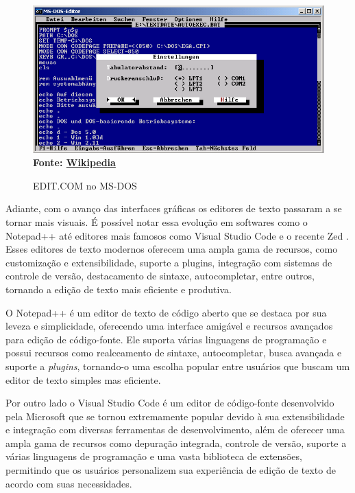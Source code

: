 \FloatBarrier
\begin{figure}[!htbp]
    \centering
    \caption{EDIT.COM no MS-DOS}
    \includegraphics[scale=0.8]{imagens/EDIT_MSDOS.png}
    \\\textbf{Fonte: \href{https://de.wikipedia.org/wiki/MS-DOS_Editor}{Wikipedia}} \label{fig:EDIT_MSDOS}
\end{figure}
\FloatBarrier

Adiante, com o avanço das interfaces gráficas os editores de
texto passaram a se tornar mais visuais. É possível notar essa evolução em softwares
como o Notepad++ \cite{NotepadPlusPlus2025} até editores mais famosos como
Visual Studio Code \cite{VSCode2025} e o recente Zed \cite{ZedEditor2025}. Esses
editores de texto modernos oferecem uma ampla gama de recursos, como
customização e extensibilidade, suporte a plugins, integração com sistemas de
controle de versão, destacamento de sintaxe, autocompletar, entre outros,
tornando a edição de texto mais eficiente e produtiva.

O Notepad++ é um editor de texto de código aberto que se destaca por sua leveza
e simplicidade, oferecendo uma interface amigável e recursos avançados para edição
de código-fonte. Ele suporta várias linguagens de programação e possui recursos
como realceamento de sintaxe, autocompletar, busca avançada e suporte a \textit{plugins},
tornando-o uma escolha popular entre usuários que buscam um editor de texto
simples mas eficiente.

Por outro lado o Visual Studio Code é um editor de código-fonte desenvolvido
pela Microsoft que se tornou extremamente popular devido à sua extensibilidade e
integração com diversas ferramentas de desenvolvimento, além de oferecer uma ampla
gama de recursos como depuração integrada, controle de versão, suporte a várias linguagens
de programação e uma vasta biblioteca de extensões, permitindo que os usuários
personalizem sua experiência de edição de texto de acordo com suas necessidades.

